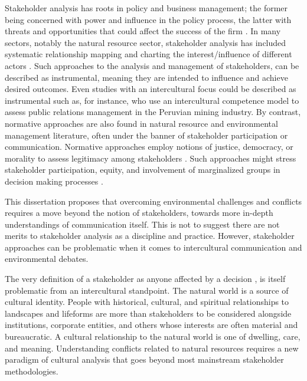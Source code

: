 Stakeholder analysis has roots in policy and business management; the former being concerned with power and influence in the policy process, the latter with threats and opportunities that could affect the success of the firm \citep{Varvasovszky2000}. In many sectors, notably the natural resource sector, stakeholder analysis has included systematic relationship mapping and charting the interest/influence of different actors \citep[e.g.][]{Lindenberg1981}. Such approaches to the analysis and management of stakeholders, can be described as instrumental, meaning they are intended to influence and achieve desired outcomes. Even studies with an intercultural focus could be described as  instrumental such as, for instance, \cite*{Wang2014a} who use an intercultural competence model to assess public relations management in the Peruvian mining industry. By contrast, normative approaches are also found in natural resource and environmental management literature, often under the banner of stakeholder participation or communication. Normative approaches employ notions of justice, democracy, or morality to assess legitimacy among stakeholders \citep[1935-36]{Reed2009}. Such approaches might stress stakeholder participation, equity, and involvement of marginalized groups in decision making processes \citep{Johnson2004}.  

This dissertation proposes that overcoming environmental challenges and conflicts requires a move beyond the notion of stakeholders, towards more in-depth understandings of communication itself. This is not to suggest there are not merits to stakeholder analysis as a discipline and practice. However, stakeholder approaches can be problematic when it comes to intercultural communication and environmental debates. 

The very definition of a stakeholder as anyone affected by a decision \citep{Freeman1983}, is itself problematic from an intercultural standpoint. The natural world is a source of cultural identity. People with historical, cultural, and spiritual relationships to landscapes and lifeforms are more than stakeholders to be considered alongside institutions, corporate entities, and others whose interests are often material and bureaucratic. A cultural relationship to the natural world is one of dwelling, care, and meaning. Understanding conflicts related to natural resources requires a new paradigm of cultural analysis that goes beyond most mainstream stakeholder methodologies.

